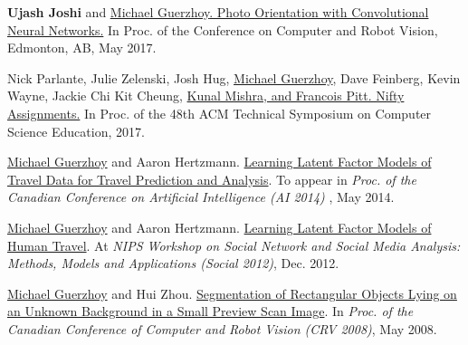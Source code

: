 \documentclass[letterpaper,11pt]{article}
\begin{document}
\begin{revnumerate}
\item
\textbf{Ujash Joshi} and \href{http://www.cs.toronto.edu/~guerzhoy/oriviz/crv17.pdf}{\underline{Michael Guerzhoy}. Photo Orientation with Convolutional Neural Networks.} In Proc. of the Conference on Computer and Robot Vision, Edmonton, AB, May 2017.  

\item
Nick Parlante, Julie Zelenski, Josh Hug, \underline{Michael Guerzhoy}, Dave Feinberg, Kevin Wayne, Jackie Chi Kit Cheung, \href{http://nifty.stanford.edu/2017/guerzhoy-SAT-synonyms/}{Kunal Mishra, and Francois Pitt. Nifty Assignments.} In Proc. of the 48th ACM Technical Symposium on Computer Science Education, 2017.

	

\item
\underline{Michael Guerzhoy} and Aaron Hertzmann. \href{http://www.cs.toronto.edu/~guerzhoy/humantravel/}{Learning Latent Factor Models of Travel Data for Travel Prediction and Analysis}. To appear in {\it Proc. of the Canadian Conference on Artificial Intelligence (AI 2014)} , May  2014.

\item
\underline{Michael Guerzhoy} and Aaron Hertzmann. \href{https://www.cs.toronto.edu/~guerzhoy/humantravel/travelmodels.pdf}{Learning Latent Factor Models of Human Travel}. At {\it NIPS Workshop on Social Network and Social Media Analysis: Methods, Models and Applications (Social 2012)}, Dec. 2012.

\item
\underline{Michael Guerzhoy} and Hui Zhou. \href{http://www.cs.toronto.edu/~guerzhoy/crv08.pdf}{Segmentation of Rectangular Objects Lying on an Unknown Background in a Small Preview Scan Image}. In {\it Proc. of the Canadian Conference of Computer and Robot Vision (CRV 2008)}, May 2008.


\end{revnumerate}
\end{document}
